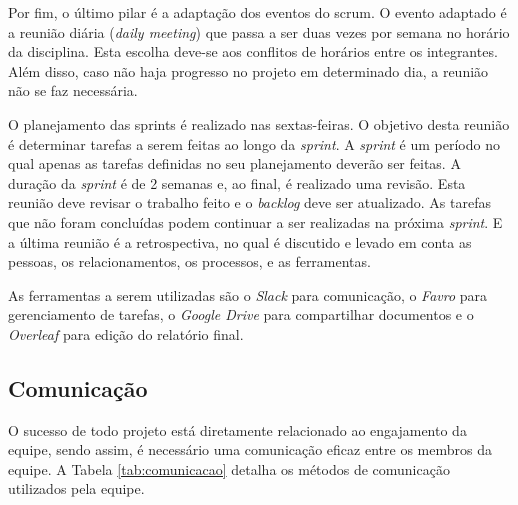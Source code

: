 Por fim, o último pilar é a adaptação dos eventos do scrum. O evento adaptado é a reunião diária (\textit{daily meeting}) que passa a ser duas vezes por semana no horário da disciplina. Esta escolha deve-se aos conflitos de horários entre os integrantes. Além disso, caso não haja progresso no projeto em determinado dia, a reunião não se faz necessária.

	O planejamento das sprints é realizado nas sextas-feiras. O objetivo desta reunião é determinar tarefas a serem feitas ao longo da \textit{sprint}. A \textit{sprint} é um período no qual apenas as tarefas definidas no seu planejamento deverão ser feitas. A duração da \textit{sprint} é de 2 semanas e, ao final, é realizado uma revisão. Esta reunião deve revisar o trabalho feito e o \textit{backlog} deve ser atualizado. As tarefas que não foram concluídas podem continuar a ser realizadas na próxima \textit{sprint}. E a última reunião é a retrospectiva, no qual é discutido e levado em conta as pessoas, os relacionamentos, os processos, e as ferramentas.
    
    As ferramentas a serem utilizadas são o \textit{Slack} para comunicação, o \textit{Favro} para gerenciamento de tarefas, o \textit{Google Drive} para compartilhar documentos e o \textit{Overleaf} para edição do relatório final.


\subsection{Comunicação}

O sucesso de todo projeto está diretamente relacionado ao engajamento da equipe, sendo assim, é necessário uma comunicação eficaz entre os membros da equipe. A Tabela \ref{tab:comunicacao} detalha os métodos de comunicação utilizados pela equipe.

\begin{table}[H]
\centering
\caption{Métodos de comunicação.}
\label{tab:comunicacao}
\end{table}



